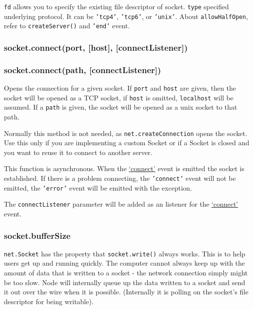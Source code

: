 \begin{Shaded}
\begin{Highlighting}[]
\NormalTok{\{ }
  \NormalTok{: }
\NormalTok{\}}
\end{Highlighting}
\end{Shaded}

\texttt{fd} allows you to specify the existing file descriptor of
socket. \texttt{type} specified underlying protocol. It can be
\texttt{'tcp4'}, \texttt{'tcp6'}, or \texttt{'unix'}. About
\texttt{allowHalfOpen}, refer to \texttt{createServer()} and
\texttt{'end'} event.

\subsubsection{socket.connect(port, {[}host{]}, {[}connectListener{]})}

\subsubsection{socket.connect(path, {[}connectListener{]})}

Opens the connection for a given socket. If \texttt{port} and
\texttt{host} are given, then the socket will be opened as a TCP socket,
if \texttt{host} is omitted, \texttt{localhost} will be assumed. If a
\texttt{path} is given, the socket will be opened as a unix socket to
that path.

Normally this method is not needed, as \texttt{net.createConnection}
opens the socket. Use this only if you are implementing a custom Socket
or if a Socket is closed and you want to reuse it to connect to another
server.

This function is asynchronous. When the
\hyperref[net\_event\_connect]{`connect'} event is emitted the socket is
established. If there is a problem connecting, the \texttt{'connect'}
event will not be emitted, the \texttt{'error'} event will be emitted
with the exception.

The \texttt{connectListener} parameter will be added as an listener for
the \hyperref[net\_event\_connect]{`connect'} event.

\subsubsection{socket.bufferSize}

\texttt{net.Socket} has the property that \texttt{socket.write()} always
works. This is to help users get up and running quickly. The computer
cannot always keep up with the amount of data that is written to a
socket - the network connection simply might be too slow. Node will
internally queue up the data written to a socket and send it out over
the wire when it is possible. (Internally it is polling on the socket's
file descriptor for being writable).

